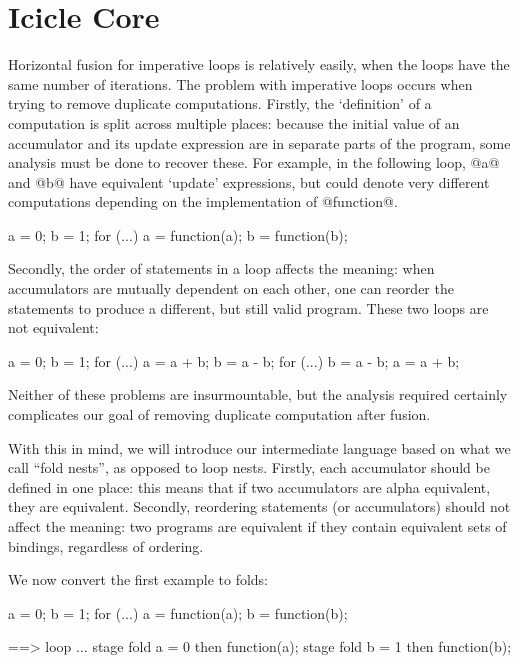 \section{Icicle Core}
\label{s:IcicleCore}

Horizontal fusion for imperative loops is relatively easily, when the loops have the same number of iterations.
The problem with imperative loops occurs when trying to remove duplicate computations.
Firstly, the `definition' of a computation is split across multiple places: because the initial value of an accumulator and its update expression are in separate parts of the program, some analysis must be done to recover these.
For example, in the following loop, @a@ and @b@ have equivalent `update' expressions, but could denote very different computations depending on the implementation of @function@.
\begin{code}
a = 0;
b = 1;
for (...) {
  a = function(a);
  b = function(b);
}
\end{code}

Secondly, the order of statements in a loop affects the meaning: when accumulators are mutually dependent on each other, one can reorder the statements to produce a different, but still valid program.
These two loops are not equivalent:
\begin{code}
a = 0;
b = 1;
for (...) {
  a = a + b;
  b = a - b;
}
for (...) {
  b = a - b;
  a = a + b;
}
\end{code}

Neither of these problems are insurmountable, but the analysis required certainly complicates our goal of removing duplicate computation after fusion.

With this in mind, we will introduce our intermediate language based on what we call ``fold nests'', as opposed to loop nests.
Firstly, each accumulator should be defined in one place: this means that if two accumulators are alpha equivalent, they are equivalent.
Secondly, reordering statements (or accumulators) should not affect the meaning: two programs are equivalent if they contain equivalent sets of bindings, regardless of ordering.

We now convert the first example to folds:
\begin{code}
a = 0;
b = 1;
for (...) {
  a = function(a);
  b = function(b);
}

==>
loop ... {
  stage {
    fold a = 0
        then function(a);
  }
  stage {
    fold b = 1
        then function(b);
  }
}
\end{code}

